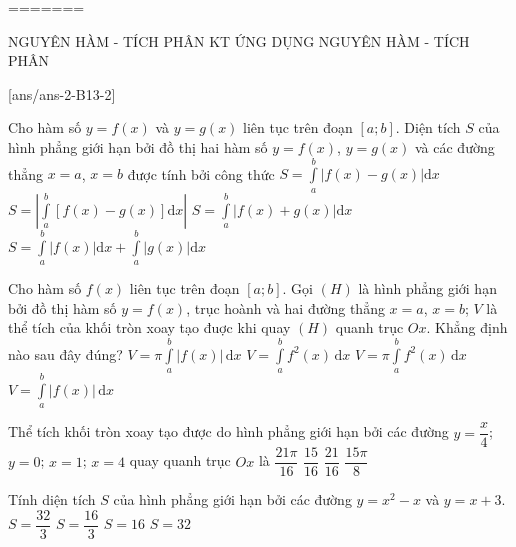 =======
\begin{name}
	{NGUYÊN HÀM - TÍCH PHÂN}
	{KT ỨNG DỤNG NGUYÊN HÀM - TÍCH PHÂN}
	{\tentruong}
	{\thoigian}
\end{name}
\setcounter{ex}{0}\setcounter{bt}{0}
[ans/ans-2-B13-2]
\caulc
\begin{ex}%
	Cho hàm số $y=f(x)$ và $y=g(x)$ liên tục trên đoạn $[a;b]$. Diện tích $S$ của hình phẳng giới hạn bởi đồ thị hai hàm số $y=f(x)$, $y=g(x)$ và các đường thẳng $x=a$, $x=b$ được tính bởi công thức	
	\choice
	{\True $\displaystyle S=\int\limits_a^b |f(x)-g(x)| \mathrm dx$}
	{$\displaystyle S= \left|\int\limits_a^b [f(x)-g(x)]\mathrm dx\right|$}
	{$\displaystyle S=\int\limits_a^b |f(x)+g(x)|\mathrm dx$}
	{$\displaystyle S=\int\limits_a^b |f(x)|\mathrm dx+\int\limits_a^b |g(x)|\mathrm dx$}
\end{ex}
\begin{ex}%
	Cho hàm số $ f(x)$ liên tục trên đoạn $ \left[a;b\right]$. Gọi $ (H)$ là hình phẳng giới hạn bởi đồ thị hàm số $ y=f(x)$, trục hoành và hai đường thẳng $ x=a$, $x=b$; $ V$ là thể tích của khối tròn xoay tạo đuợc khi quay $ (H)$ quanh trục $ Ox$. Khẳng định nào sau đây đúng?
	\choice
	{$ V=\pi \displaystyle\int\limits_{a}^{b} \left|f(x)\right|\mathrm{\,d}x$}
	{$ V=\displaystyle\int\limits_{a}^{b}f^2(x)\mathrm{\,d}x$}
	{\True $ V=\pi \displaystyle\int\limits_{a}^{b}f^2(x)\mathrm{\,d}x$}
	{$ V=\displaystyle\int\limits_{a}^{b}\left|f(x)\right|\mathrm{\,d}x$}
\end{ex} 
\begin{ex}%
	Thể tích khối tròn xoay tạo được do hình phẳng giới hạn bởi các đường $ y=\dfrac{x}{4}$; $y=0$; $x=1$; $x=4 $ quay quanh trục $ Ox $ là
	\choice
	{\True $ \dfrac{21\pi}{16} $}
	{$ \dfrac{15}{16} $}
	{$ \dfrac{21}{16} $}
	{$ \dfrac{15\pi}{8} $}
\end{ex}
\begin{ex}%
	Tính diện tích $S$ của hình phẳng giới hạn bởi các đường $y = x^2 - x$ và $y = x + 3$.
	\choice
	{\True $S = \dfrac{32}{3}$}
	{$S = \dfrac{16}{3}$}
	{$S = 16$}
	{$S = 32$}
\end{ex}
